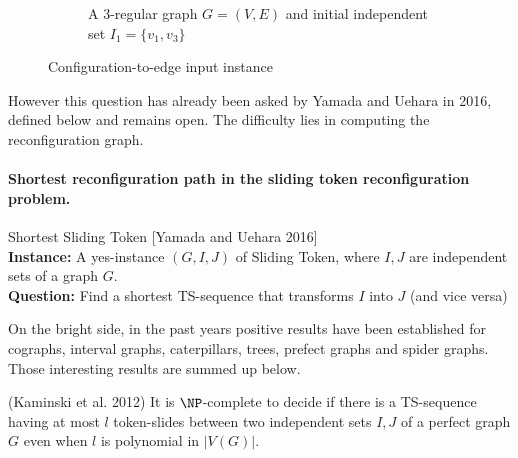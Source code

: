 \begin{figure}[H]
\begin{subfigure}[b]{0.3\textwidth}
\begin{scaletikzpicturetowidth}{\textwidth}
        \end{scaletikzpicturetowidth}
        \caption{A $3$-regular graph $G=(V,E)$ and initial independent set $I_1 = \{v_1, v_3\}$}
        \label{fig:s23}
    \end{subfigure}
    \caption{Configuration-to-edge input instance}
    \label{fig:sequence2}
\end{figure}

However this question has already been asked by Yamada and Uehara in 2016, defined below and remains open. The difficulty lies in
computing the reconfiguration graph.
\paragraph{Shortest reconfiguration path in the sliding token reconfiguration problem.}
\begin{flushleft}
    Shortest Sliding Token [Yamada and Uehara 2016]\\
    \textbf{Instance: } A yes-instance $(G, I, J)$ of Sliding Token, where $I, J$ are independent sets of a graph $G$. \\
    \textbf{Question: } Find a shortest TS-sequence that transforms $I$ into $J$ (and vice versa) \\
\end{flushleft}

On the bright side, in the past years positive results have been established for cographs, interval graphs, caterpillars, trees,
prefect graphs and spider graphs. Those interesting results are summed up below.
\begin{theorem}(Kaminski et al. 2012)
It is $\NP$-complete to decide if there is a TS-sequence having at most $l$ token-slides between two independent sets $I, J$ of a
perfect graph $G$ even when $l$ is polynomial in $|V(G)|$.
\end{theorem}

